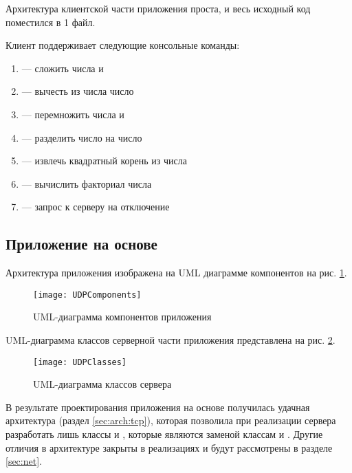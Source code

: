 Архитектура клиентской части приложения проста, и весь исходный код поместился в 1 файл.

Клиент поддерживает следующие консольные команды:

\begin{enumerate}
	\item {} --- сложить числа  и 
	\item {} --- вычесть из числа  число 
	\item {} --- перемножить числа  и 
	\item {} --- разделить число  на число 
	\item {} --- извлечь квадратный корень из числа 
	\item {} --- вычислить факториал числа 
	\item {} --- запрос к серверу на отключение
\end{enumerate}

\subsection{Приложение на основе }

Архитектура приложения изображена на UML диаграмме компонентов на рис. \ref{fig:udp-comp}.

\begin{figure}[H]
	\centering
	\texttt{[image: UDPComponents]}
	\caption{UML-диаграмма компонентов  приложения}
	\label{fig:udp-comp}
\end{figure}

UML-диаграмма классов серверной части приложения представлена на рис. \ref{fig:udp-classes}.

\begin{figure}[H]
	\centering
	\texttt{[image: UDPClasses]}
	\caption{UML-диаграмма классов  сервера}
	\label{fig:udp-classes}
\end{figure}

В результате проектирования приложения на основе  получилась удачная архитектура (раздел \ref{sec:arch:tcp}), которая позволила при реализации  сервера разработать лишь классы  и , которые являются заменой классам  и . Другие отличия в архитектуре закрыты в реализациях  и будут рассмотрены в разделе \ref{sec:net}.\\[3mm]


